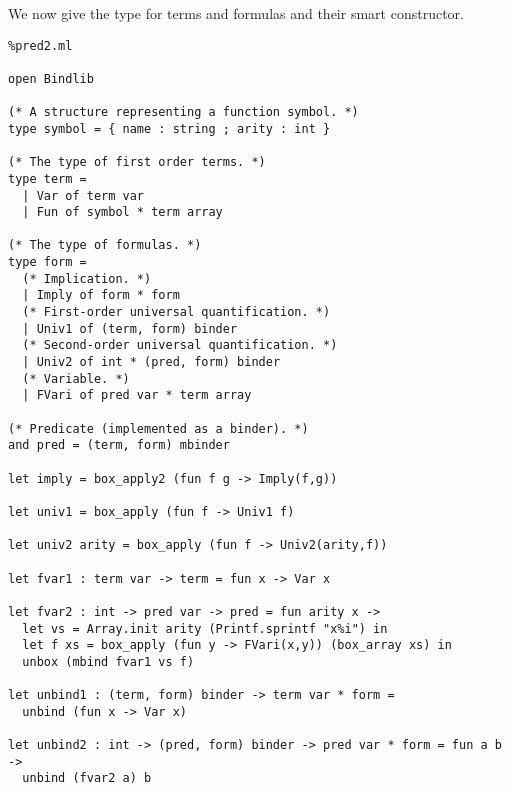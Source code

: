 \documentclass[11pt]{article}
\begin{document}
We now give the type for terms and formulas and their smart constructor.
\begin{lstlisting}%pred2.ml

open Bindlib

(* A structure representing a function symbol. *)
type symbol = { name : string ; arity : int }

(* The type of first order terms. *)
type term =
  | Var of term var
  | Fun of symbol * term array

(* The type of formulas. *)
type form =
  (* Implication. *)
  | Imply of form * form
  (* First-order universal quantification. *)
  | Univ1 of (term, form) binder
  (* Second-order universal quantification. *)
  | Univ2 of int * (pred, form) binder
  (* Variable. *)
  | FVari of pred var * term array

(* Predicate (implemented as a binder). *)
and pred = (term, form) mbinder

let imply = box_apply2 (fun f g -> Imply(f,g))

let univ1 = box_apply (fun f -> Univ1 f)

let univ2 arity = box_apply (fun f -> Univ2(arity,f))

let fvar1 : term var -> term = fun x -> Var x

let fvar2 : int -> pred var -> pred = fun arity x ->
  let vs = Array.init arity (Printf.sprintf "x%i") in
  let f xs = box_apply (fun y -> FVari(x,y)) (box_array xs) in
  unbox (mbind fvar1 vs f)

let unbind1 : (term, form) binder -> term var * form =
  unbind (fun x -> Var x)

let unbind2 : int -> (pred, form) binder -> pred var * form = fun a b ->
  unbind (fvar2 a) b
\end{lstlisting}
\end{document}
